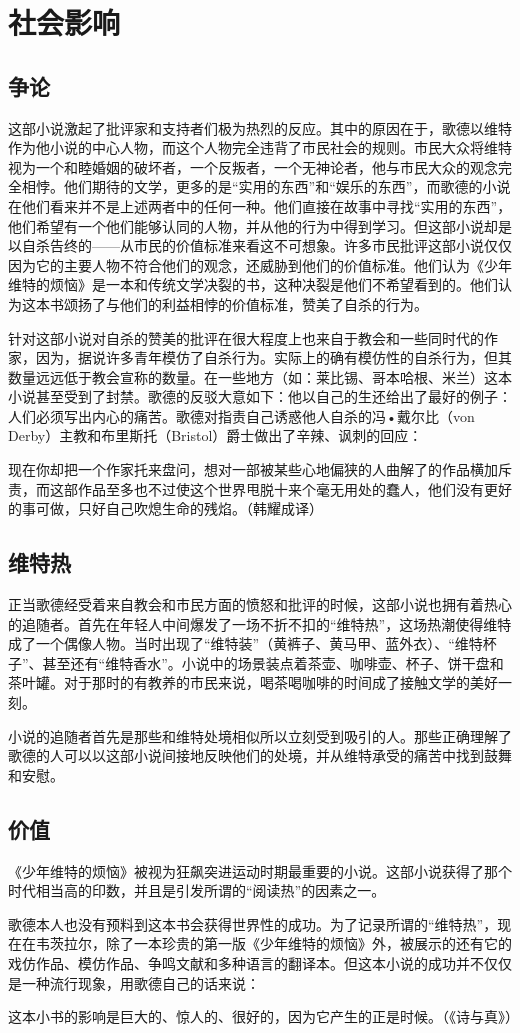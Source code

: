 \documentclass[12pt,oneside]{book}
\begin{document}
\chapter{社会影响}
\section{争论}
这部小说激起了批评家和支持者们极为热烈的反应。其中的原因在于，歌德以维特作为他小说的中心人物，而这个人物完全违背了市民社会的规则。市民大众将维特视为一个和睦婚姻的破坏者，一个反叛者，一个无神论者，他与市民大众的观念完全相悖。他们期待的文学，更多的是“实用的东西”和“娱乐的东西”，而歌德的小说在他们看来并不是上述两者中的任何一种。他们直接在故事中寻找“实用的东西”，他们希望有一个他们能够认同的人物，并从他的行为中得到学习。但这部小说却是以自杀告终的——从市民的价值标准来看这不可想象。许多市民批评这部小说仅仅因为它的主要人物不符合他们的观念，还威胁到他们的价值标准。他们认为《少年维特的烦恼》是一本和传统文学决裂的书，这种决裂是他们不希望看到的。他们认为这本书颂扬了与他们的利益相悖的价值标准，赞美了自杀的行为。

针对这部小说对自杀的赞美的批评在很大程度上也来自于教会和一些同时代的作家，因为，据说许多青年模仿了自杀行为。实际上的确有模仿性的自杀行为，但其数量远远低于教会宣称的数量。在一些地方（如：莱比锡、哥本哈根、米兰）这本小说甚至受到了封禁。歌德的反驳大意如下：他以自己的生还给出了最好的例子：人们必须写出内心的痛苦。歌德对指责自己诱惑他人自杀的冯•戴尔比（von Derby）主教和布里斯托（Bristol）爵士做出了辛辣、讽刺的回应：

现在你却把一个作家托来盘问，想对一部被某些心地偏狭的人曲解了的作品横加斥责，而这部作品至多也不过使这个世界甩脱十来个毫无用处的蠢人，他们没有更好的事可做，只好自己吹熄生命的残焰。（韩耀成译）


\section{维特热}
正当歌德经受着来自教会和市民方面的愤怒和批评的时候，这部小说也拥有着热心的追随者。首先在年轻人中间爆发了一场不折不扣的“维特热”，这场热潮使得维特成了一个偶像人物。当时出现了“维特装”（黄裤子、黄马甲、蓝外衣）、“维特杯子”、甚至还有“维特香水”。小说中的场景装点着茶壶、咖啡壶、杯子、饼干盘和茶叶罐。对于那时的有教养的市民来说，喝茶喝咖啡的时间成了接触文学的美好一刻。

小说的追随者首先是那些和维特处境相似所以立刻受到吸引的人。那些正确理解了歌德的人可以以这部小说间接地反映他们的处境，并从维特承受的痛苦中找到鼓舞和安慰。



\section{价值}
《少年维特的烦恼》被视为狂飙突进运动时期最重要的小说。这部小说获得了那个时代相当高的印数，并且是引发所谓的“阅读热”的因素之一。

歌德本人也没有预料到这本书会获得世界性的成功。为了记录所谓的“维特热”，现在在韦茨拉尔，除了一本珍贵的第一版《少年维特的烦恼》外，被展示的还有它的戏仿作品、模仿作品、争鸣文献和多种语言的翻译本。但这本小说的成功并不仅仅是一种流行现象，用歌德自己的话来说：

这本小书的影响是巨大的、惊人的、很好的，因为它产生的正是时候。（《诗与真》）
\end{document}
